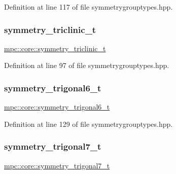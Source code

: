 Definition at line 117 of file symmetrygrouptypes.\+hpp.

\mbox{\label{namespacempc_1_1core_aac81e6abdf397b85db386498023abce6}} 
\subsubsection{\texorpdfstring{symmetry\+\_\+triclinic\+\_\+t}{symmetry\_triclinic\_t}}
{\footnotesize\ttfamily \mbox{\hyperlink{namespacempc_1_1core_aac81e6abdf397b85db386498023abce6}{mpc\+::core\+::symmetry\+\_\+triclinic\+\_\+t}}}



Definition at line 97 of file symmetrygrouptypes.\+hpp.

\mbox{\label{namespacempc_1_1core_af428acbfa5a27a2eceab3d2cdfb7f9ce}} 
\subsubsection{\texorpdfstring{symmetry\+\_\+trigonal6\+\_\+t}{symmetry\_trigonal6\_t}}
{\footnotesize\ttfamily \mbox{\hyperlink{namespacempc_1_1core_af428acbfa5a27a2eceab3d2cdfb7f9ce}{mpc\+::core\+::symmetry\+\_\+trigonal6\+\_\+t}}}



Definition at line 129 of file symmetrygrouptypes.\+hpp.

\mbox{\label{namespacempc_1_1core_a9bab7237b00addccb251ac236fd8d160}} 
\subsubsection{\texorpdfstring{symmetry\+\_\+trigonal7\+\_\+t}{symmetry\_trigonal7\_t}}
{\footnotesize\ttfamily \mbox{\hyperlink{namespacempc_1_1core_a9bab7237b00addccb251ac236fd8d160}{mpc\+::core\+::symmetry\+\_\+trigonal7\+\_\+t}}}



